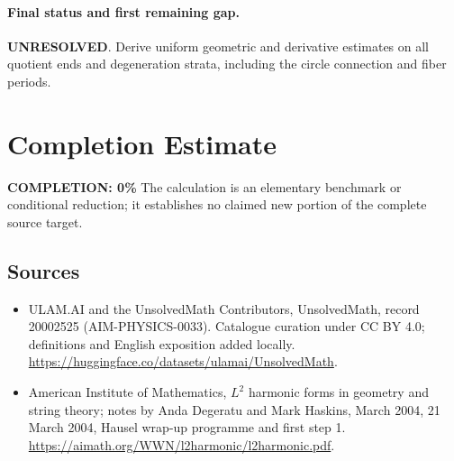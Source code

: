 \documentclass[11pt]{article}
\begin{document}
\paragraph{Final status and first remaining gap.}
\textbf{UNRESOLVED}. Derive uniform geometric and derivative estimates on all quotient ends and degeneration strata, including the circle connection and fiber periods.

\section{Completion Estimate}
\noindent\textbf{COMPLETION: 0\%}
The calculation is an elementary benchmark or conditional reduction; it establishes no claimed new portion of the complete source target.

\subsection{Sources}
\begin{itemize}
\item[\hypertarget{source:20002525:1}{S1}] ULAM.AI and the UnsolvedMath Contributors, UnsolvedMath, record 20002525 (AIM-PHYSICS-0033). Catalogue curation under CC BY 4.0; definitions and English exposition added locally.
\url{https://huggingface.co/datasets/ulamai/UnsolvedMath}.
\item[\hypertarget{source:20002525:2}{S2}] American Institute of Mathematics, $L^2$ harmonic forms in geometry and string theory; notes by Anda Degeratu and Mark Haskins, March 2004, 21 March 2004, Hausel wrap-up programme and first step 1.
\url{https://aimath.org/WWN/l2harmonic/l2harmonic.pdf}.
\end{itemize}
\label{end:20002525}
\end{document}
